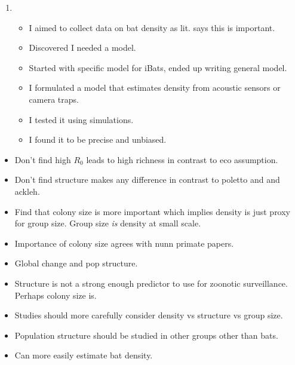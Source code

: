 \begin{enumerate}
\item
\begin{itemize}
\item I aimed to collect data on bat density as lit. says this is important.
\item Discovered I needed a model.
\item Started with specific model for iBats, ended up writing general model.
\item I formulated a model that estimates density from acoustic sensors or camera traps.
\item I tested it using simulations.
\item I found it to be precise and unbiased.
\end{itemize}

\end{enumerate}







\begin{itemize}
\item Don't find high $R_0$ leads to high richness in contrast to eco assumption.
\item Don't find structure makes any difference in contrast to poletto and \cite{nunes2006localized} and ackleh.
\item Find that colony size is more important which implies density is just proxy for group size. Group size \emph{is} density at small scale.
\item Importance of colony size agrees with nunn primate papers.
\end{itemize}





\begin{itemize}
\item Global change and pop structure.
\item Structure is not a strong enough predictor to use for zoonotic surveillance. Perhaps colony size is.
\item Studies should more carefully consider density vs structure vs group size.
\item Population structure should be studied in other groups other than bats.
\item Can more easily estimate bat density.
\end{itemize}






